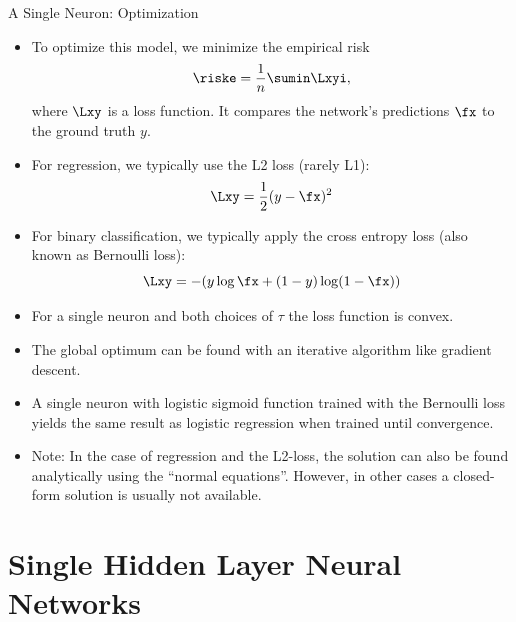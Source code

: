 \begin{vbframe} {A Single Neuron: Optimization}
\begin{itemize}
\item To optimize this model, we minimize the empirical risk 
$$\riske = \frac{1}{n} \sumin \Lxyi,$$
where $\Lxy$ is a loss function. It compares the network's predictions $\fx$ to the ground truth $y$. 
\item For regression, we typically use the L2 loss (rarely L1): $$\Lxy = \frac{1}{2}(y - \fx)^2$$
\item For binary classification, we typically apply the cross entropy loss (also known as Bernoulli loss): $$\Lxy = -(y \log \fx + (1 - y) \log(1 - \fx))$$
\framebreak 

\vspace{.5cm}
\item For a single neuron and both choices of $\tau$ the loss function is convex.
\item The global optimum can be found with an iterative algorithm like gradient descent. 
\item A single neuron with logistic sigmoid function trained with the Bernoulli loss %
 yields the %
 same result as logistic regression when trained until convergence.
\item Note: In the case of regression and the L2-loss, the solution can
also be found analytically using the “normal equations”. However, in other cases a closed-form solution is usually not available.
\end{itemize}
\end{vbframe} 


\section{Single Hidden Layer Neural Networks}

